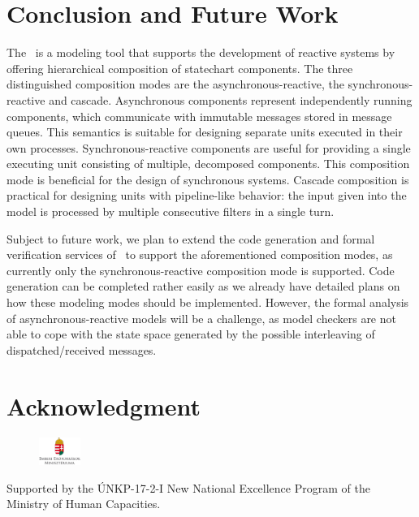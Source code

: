 \section{Conclusion and Future Work}
\label{sec:conclusion}
The \framework\ is a modeling tool that supports the development of reactive systems by offering hierarchical composition of statechart components. The three distinguished composition modes are the asynchronous-reactive, the synchronous-reactive and cascade. Asynchronous components represent independently running components, which communicate with immutable messages stored in message queues. This semantics is suitable for designing
separate units executed in their own processes. Synchronous-reactive components are useful for providing a single executing unit consisting of multiple, decomposed components.
This composition mode is beneficial for the design of synchronous systems. Cascade composition is practical for designing units with pipeline-like behavior: the input given into the model is processed by multiple consecutive filters in a single turn.

Subject to future work, we plan to extend the code generation and formal verification services of \gamma\ to support the aforementioned composition modes, as currently only the synchronous-reactive composition mode is supported. Code generation can be completed rather easily as we already have detailed plans on how these modeling modes should be implemented. However, the formal analysis of asynchronous-reactive models will be a challenge, as model checkers are not able to cope with the state space generated by the possible interleaving of dispatched/received messages.

\section*{Acknowledgment}
\begin{figure}[!h]
	\centering
	\includegraphics[width=0.12\textwidth]{figures/unkp_logo.jpg}
\end{figure}
Supported by the ÚNKP-17-2-I New National Excellence Program of the Ministry of Human Capacities.
